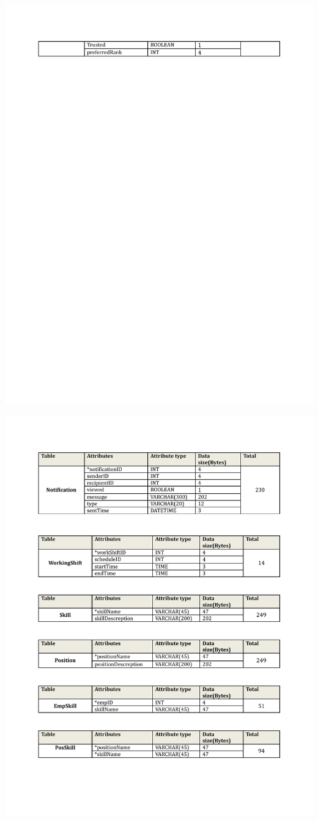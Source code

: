 \documentclass[letterpaper,12pt]{report}
\begin{document}
\newpage
\includegraphics[trim=30mm 10mm 25mm 30mm]{ExternalFiles/DocumentStuff/datasizes2.pdf}

\newpage
\includegraphics[trim=30mm 10mm 25mm 30mm]{ExternalFiles/DocumentStuff/datasizes3.pdf}
\end{document}
